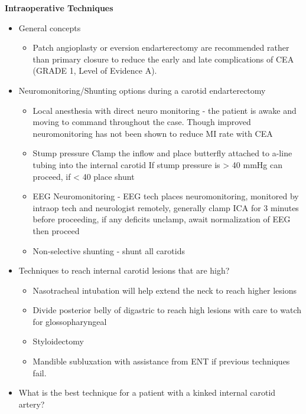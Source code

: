 \documentclass[
]{book}
\providecommand{\tightlist}{%
  \setlength{\itemsep}{0pt}\setlength{\parskip}{0pt}}
\begin{document}
\textbf{Intraoperative Techniques}

\begin{itemize}
\item
  General concepts

  \begin{itemize}
  \tightlist
  \item
    Patch angioplasty or eversion endarterectomy are recommended
    rather than primary closure to reduce the early and late
    complications of CEA (GRADE 1, Level of Evidence A).
  \end{itemize}
\item
  Neuromonitoring/Shunting options during a carotid endarterectomy

  \begin{itemize}
  \item
    Local anesthesia with direct neuro monitoring - the patient is
    awake and moving to command throughout the case. Though improved
    neuromonitoring has not been shown to reduce MI rate with CEA
  \item
    Stump pressure Clamp the inflow and place butterfly attached to
    a-line tubing into the internal carotid If stump pressure is \textgreater{}
    40 mmHg can proceed, if \textless{} 40 place shunt
  \item
    EEG Neuromonitoring - EEG tech places neuromonitoring, monitored
    by intraop tech and neurologist remotely, generally clamp ICA
    for 3 minutes before proceeding, if any deficits unclamp, await
    normalization of EEG then proceed
  \item
    Non-selective shunting - shunt all carotids
  \end{itemize}
\item
  Techniques to reach internal carotid lesions that are high?

  \begin{itemize}
  \item
    Nasotracheal intubation will help extend the neck to reach
    higher lesions
  \item
    Divide posterior belly of digastric to reach high lesions with
    care to watch for glossopharyngeal
  \item
    Styloidectomy
  \item
    Mandible subluxation with assistance from ENT if previous
    techniques fail.
  \end{itemize}
\item
  What is the best technique for a patient with a kinked internal
  carotid artery?


\end{itemize}
\end{document}
